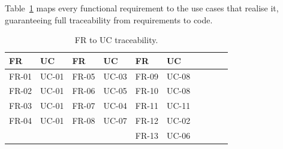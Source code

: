 Table~\ref{tab:trace} maps every functional requirement to the use cases that
realise it, guaranteeing full traceability from requirements to code.

\begin{table}[H]
\centering
\caption{FR to UC traceability.}
\label{tab:trace}
\begin{tabular}{@{}ll@{}ll@{}ll@{}ll@{}ll@{}}
\toprule
\textbf{FR} & \textbf{UC} & \textbf{FR} & \textbf{UC} & \textbf{FR} & \textbf{UC} \\
\midrule
FR-01 & UC-01 & FR-05 & UC-03 & FR-09 & UC-08 \\
FR-02 & UC-01 & FR-06 & UC-05 & FR-10 & UC-08 \\
FR-03 & UC-01 & FR-07 & UC-04 & FR-11 & UC-11 \\
FR-04 & UC-01 & FR-08 & UC-07 & FR-12 & UC-02 \\
 & & & & FR-13 & UC-06 \\
\bottomrule
\end{tabular}
\end{table}
